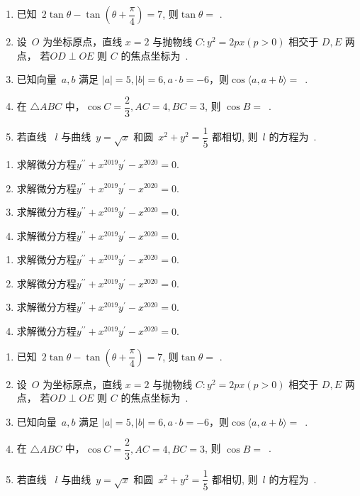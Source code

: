 \documentclass[twoside]{ctexart}
\newcommand{\tk}{\underline{\hspace*{1.5cm}}}
\begin{document}
\Watermark
\EvenWatermark
\OddWatermark
\begin{enumerate}
    \item 已知~$2\tan \theta-\tan(\theta+\dfrac{\pi}{4})=7$, 则$\tan \theta =$ \tk .
    \item 设~$O$ 为坐标原点，直线 $ x = 2$ 与抛物线 $C: y^2=2px( p > 0)$ 相交于 $D,E$
    两点， 若$OD\perp OE $ 则 $C$ 的焦点坐标为~\tk.
    \item 已知向量~$ a,  b$ 满足 $| a|= 5, | b|=6,  a\cdot b = -6$，则$\cos\langle a,  a+ b\rangle=$~\tk.
    \item 在 $\triangle ABC$ 中，$\cos C = \dfrac{2}{3}, AC= 4, BC= 3$, 则 $\cos B=$~\tk.
    \item 若直线 ~$l$ 与曲线~$y=\sqrt{x}$ 和圆~$x^2+y^2=\dfrac{1}{5}$ 都相切, 则~$l$ 的方程为~\tk.
\end{enumerate}
\newpage
\begin{enumerate}
    \item 求解微分方程$y^{\prime \prime }+x^{2019} y^{\prime }-x^{2020}=0$. 
    \item 求解微分方程$y^{\prime \prime }+x^{2019} y^{\prime }-x^{2020}=0$. 
    \item 求解微分方程$y^{\prime \prime }+x^{2019} y^{\prime }-x^{2020}=0$. 
    \item 求解微分方程$y^{\prime \prime }+x^{2019} y^{\prime }-x^{2020}=0$.   
\end{enumerate}
\newpage
\begin{enumerate}
    \item 求解微分方程$y^{\prime \prime }+x^{2019} y^{\prime }-x^{2020}=0$. 
    \item 求解微分方程$y^{\prime \prime }+x^{2019} y^{\prime }-x^{2020}=0$. 
    \item 求解微分方程$y^{\prime \prime }+x^{2019} y^{\prime }-x^{2020}=0$. 
    \item 求解微分方程$y^{\prime \prime }+x^{2019} y^{\prime }-x^{2020}=0$.   
\end{enumerate}
\newpage
\begin{enumerate}
    \item 已知~$2\tan \theta-\tan(\theta+\dfrac{\pi}{4})=7$, 则$\tan \theta =$ \tk .
    \item 设~$O$ 为坐标原点，直线 $ x = 2$ 与抛物线 $C: y^2=2px( p > 0)$ 相交于 $D,E$
    两点， 若$OD\perp OE $ 则 $C$ 的焦点坐标为~\tk.
    \item 已知向量~$ a,  b$ 满足 $| a|= 5, | b|=6,  a\cdot b = -6$，则$\cos\langle a,  a+ b\rangle=$~\tk.
    \item 在 $\triangle ABC$ 中，$\cos C = \dfrac{2}{3}, AC= 4, BC= 3$, 则 $\cos B=$~\tk.
    \item 若直线 ~$l$ 与曲线~$y=\sqrt{x}$ 和圆~$x^2+y^2=\dfrac{1}{5}$ 都相切, 则~$l$ 的方程为~\tk.
\end{enumerate}
\end{document}
